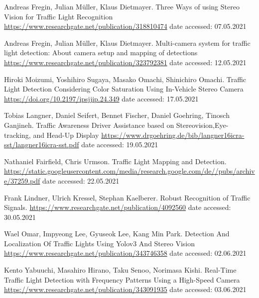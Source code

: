 \documentclass[letterpaper, 10 pt, conference]{ieeeconf} %
\begin{document}
\begin{thebibliography}{99}

 Andreas Fregin, Julian M\"uller, Klaus Dietmayer. Three Ways of using Stereo Vision for Traffic Light Recognition \url{https://www.researchgate.net/publication/318810474} date accessed: 07.05.2021

 Andreas Fregin, Julian M\"uller, Klaus Dietmayer. Multi-camera system for traffic light detection: About camera setup and mapping of detections \url{https://www.researchgate.net/publication/323792381} date accessed: 12.05.2021

 Hiroki Moizumi, Yoshihiro Sugaya, Masako Omachi, Shinichiro Omachi. Traffic Light Detection Considering Color Saturation Using In-Vehicle Stereo Camera \url{https://doi.org/10.2197/ipsjjip.24.349} date accessed: 17.05.2021

 Tobias Langner, Daniel Seifert, Bennet Fischer, Daniel Goehring, Tinosch Ganjineh. Traffic Awareness Driver Assistance based on Stereovision,Eye-tracking, and Head-Up Display \url{https://www.drgoehring.de/bib/langner16icra-sst/langner16icra-sst.pdf} date accessed: 19.05.2021

Nathaniel Fairfield, Chris Urmson. Traffic Light Mapping and Detection. \url{https://static.googleusercontent.com/media/research.google.com/de//pubs/archive/37259.pdf} date accessed: 22.05.2021

Frank Lindner, Ulrich Kressel, Stephan Kaelberer. Robust Recognition of Traffic Signals. \url{https://www.researchgate.net/publication/4092560} date accessed: 30.05.2021

Wael Omar, Impyeong Lee, Gyuseok Lee, Kang Min Park. Detection And Localization Of Traffic Lights Using Yolov3 And Stereo Vision \url{https://www.researchgate.net/publication/343746358} date accessed: 02.06.2021

Kento Yabuuchi, Masahiro Hirano, Taku Senoo, Norimasa Kishi. Real-Time Traffic Light Detection with Frequency Patterns Using a High-Speed Camera \url{https://www.researchgate.net/publication/343091935} date accessed: 03.06.2021


\end{thebibliography}
\end{document}
